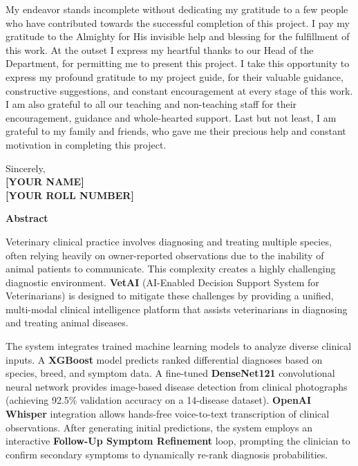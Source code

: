 \documentclass[a4paper,12pt]{report}
\begin{document}
\noindent My endeavor stands incomplete without dedicating my gratitude to a few people who have contributed towards the successful completion of this project. I pay my gratitude to the Almighty for His invisible help and blessing for the fulfillment of this work. At the outset I express my heartful thanks to our Head of the Department, for permitting me to present this project. I take this opportunity to express my profound gratitude to my project guide, for their valuable guidance, constructive suggestions, and constant encouragement at every stage of this work. I am also grateful to all our teaching and non-teaching staff for their encouragement, guidance and whole-hearted support. Last but not least, I am grateful to my family and friends, who gave me their precious help and constant motivation in completing this project.

\vspace{3cm} 

\begin{flushright}
Sincerely,\\
\textbf{[YOUR NAME]}\\
\textbf{[YOUR ROLL NUMBER]}
\end{flushright}

\newpage
\begin{center}
\Large\textbf{Abstract}
\end{center}

Veterinary clinical practice involves diagnosing and treating multiple species, often relying heavily on owner-reported observations due to the inability of animal patients to communicate. This complexity creates a highly challenging diagnostic environment. \textbf{VetAI} (AI-Enabled Decision Support System for Veterinarians) is designed to mitigate these challenges by providing a unified, multi-modal clinical intelligence platform that assists veterinarians in diagnosing and treating animal diseases.

The system integrates trained machine learning models to analyze diverse clinical inputs. A \textbf{XGBoost} model predicts ranked differential diagnoses based on species, breed, and symptom data. A fine-tuned \textbf{DenseNet121} convolutional neural network provides image-based disease detection from clinical photographs (achieving 92.5\% validation accuracy on a 14-disease dataset). \textbf{OpenAI Whisper} integration allows hands-free voice-to-text transcription of clinical observations. After generating initial predictions, the system employs an interactive \textbf{Follow-Up Symptom Refinement} loop, prompting the clinician to confirm secondary symptoms to dynamically re-rank diagnosis probabilities.
\end{document}
